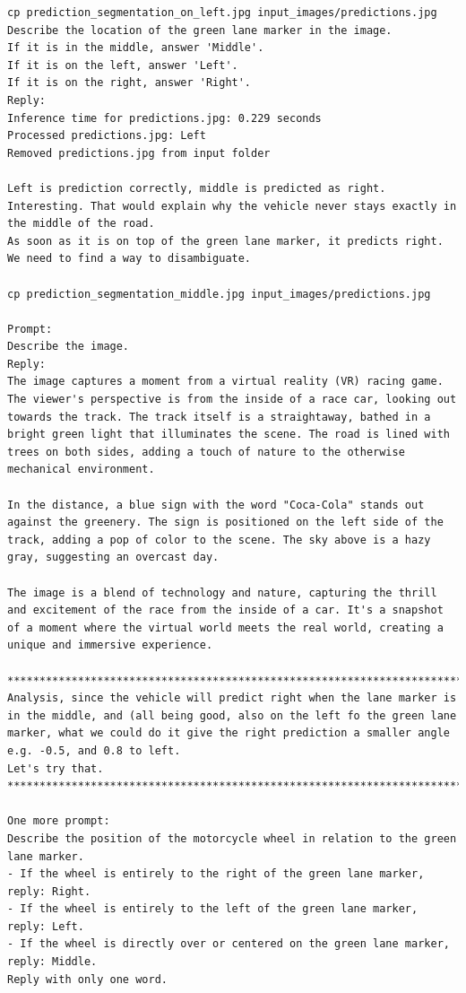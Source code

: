 \begin{verbatim}
cp prediction_segmentation_on_left.jpg input_images/predictions.jpg
Describe the location of the green lane marker in the image.
If it is in the middle, answer 'Middle'.
If it is on the left, answer 'Left'.
If it is on the right, answer 'Right'.
Reply:
Inference time for predictions.jpg: 0.229 seconds
Processed predictions.jpg: Left
Removed predictions.jpg from input folder

Left is prediction correctly, middle is predicted as right.
Interesting. That would explain why the vehicle never stays exactly in the middle of the road.
As soon as it is on top of the green lane marker, it predicts right.
We need to find a way to disambiguate.

cp prediction_segmentation_middle.jpg input_images/predictions.jpg

Prompt:
Describe the image.  
Reply:
The image captures a moment from a virtual reality (VR) racing game. The viewer's perspective is from the inside of a race car, looking out towards the track. The track itself is a straightaway, bathed in a bright green light that illuminates the scene. The road is lined with trees on both sides, adding a touch of nature to the otherwise mechanical environment.

In the distance, a blue sign with the word "Coca-Cola" stands out against the greenery. The sign is positioned on the left side of the track, adding a pop of color to the scene. The sky above is a hazy gray, suggesting an overcast day.

The image is a blend of technology and nature, capturing the thrill and excitement of the race from the inside of a car. It's a snapshot of a moment where the virtual world meets the real world, creating a unique and immersive experience.

**********************************************************************************************
Analysis, since the vehicle will predict right when the lane marker is in the middle, and (all being good, also on the left fo the green lane marker, what we could do it give the right prediction a smaller angle e.g. -0.5, and 0.8 to left.
Let's try that.
**********************************************************************************************

One more prompt:
Describe the position of the motorcycle wheel in relation to the green lane marker. 
- If the wheel is entirely to the right of the green lane marker, reply: Right.
- If the wheel is entirely to the left of the green lane marker, reply: Left.
- If the wheel is directly over or centered on the green lane marker, reply: Middle.
Reply with only one word.


\end{verbatim}

